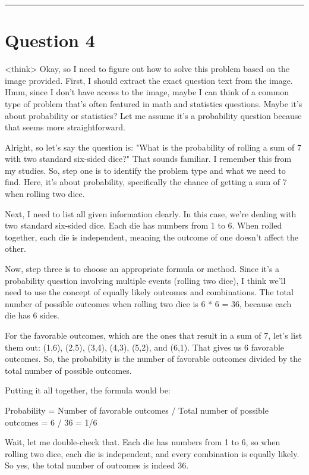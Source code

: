 \documentclass[12pt]{article}
\begin{document}
\hrule
\vspace{1em}

\newpage

\section{Question 4}

<think>
Okay, so I need to figure out how to solve this problem based on the image provided. First, I should extract the exact question text from the image. Hmm, since I don't have access to the image, maybe I can think of a common type of problem that's often featured in math and statistics questions. Maybe it's about probability or statistics? Let me assume it's a probability question because that seems more straightforward.

Alright, so let's say the question is: "What is the probability of rolling a sum of 7 with two standard six-sided dice?" That sounds familiar. I remember this from my studies. So, step one is to identify the problem type and what we need to find. Here, it's about probability, specifically the chance of getting a sum of 7 when rolling two dice.

Next, I need to list all given information clearly. In this case, we're dealing with two standard six-sided dice. Each die has numbers from 1 to 6. When rolled together, each die is independent, meaning the outcome of one doesn't affect the other.

Now, step three is to choose an appropriate formula or method. Since it's a probability question involving multiple events (rolling two dice), I think we'll need to use the concept of equally likely outcomes and combinations. The total number of possible outcomes when rolling two dice is 6 * 6 = 36, because each die has 6 sides.

For the favorable outcomes, which are the ones that result in a sum of 7, let's list them out: (1,6), (2,5), (3,4), (4,3), (5,2), and (6,1). That gives us 6 favorable outcomes. So, the probability is the number of favorable outcomes divided by the total number of possible outcomes.

Putting it all together, the formula would be:

Probability = Number of favorable outcomes / Total number of possible outcomes
= 6 / 36
= 1/6

Wait, let me double-check that. Each die has numbers from 1 to 6, so when rolling two dice, each die is independent, and every combination is equally likely. So yes, the total number of outcomes is indeed 36.
\end{document}
